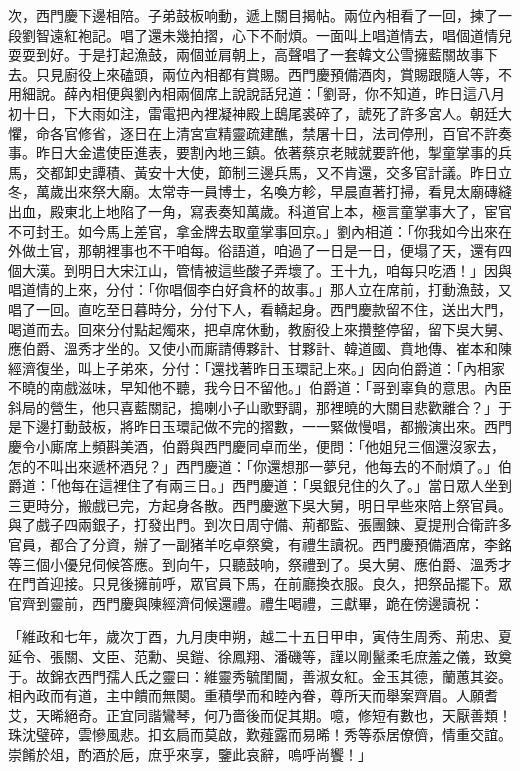 次，西門慶下邊相陪。子弟鼓板响動，遞上關目揭帖。兩位內相看了一回，揀了一段劉智遠紅袍記。唱了還未幾拍摺，心下不耐煩。一面叫上唱道情去，唱個道情兒耍耍到好。于是打起漁鼓，兩個並肩朝上，高聲唱了一套韓文公雪擁藍關故事下去。只見廚役上來磕頭，兩位內相都有賞賜。西門慶預備酒肉，賞賜跟隨人等，不用細說。薛內相便與劉內相兩個席上說說話兒道：「劉哥，你不知道，昨日這八月初十日，下大雨如注，雷電把內裡凝神殿上鴟尾裘碎了，諕死了許多宮人。朝廷大懼，命各官修省，逐日在上清宮宣精靈疏建醮，禁屠十日，法司停刑，百官不許奏事。昨日大金遣使臣進表，要割內地三鎮。依著蔡京老賊就要許他，掣童掌事的兵馬，交都卸史譚積、黃安十大使，節制三邊兵馬，又不肯還，交多官計議。昨日立冬，萬歲出來祭大廟。太常寺一員博士，名喚方軫，早晨直著打掃，看見太廟磚縫出血，殿東北上地陷了一角，寫表奏知萬歲。科道官上本，極言童掌事大了，宦官不可封王。如今馬上差官，拿金牌去取童掌事回京。」劉內相道：「你我如今出來在外做土官，那朝裡事也不干咱每。俗語道，咱過了一日是一日，便塌了天，還有四個大漢。到明日大宋江山，管情被這些酸子弄壞了。王十九，咱每只吃酒！」因與唱道情的上來，分付：「你唱個李白好貪杯的故事。」那人立在席前，打動漁鼓，又唱了一回。直吃至日暮時分，分付下人，看轎起身。西門慶款留不住，送出大門，喝道而去。回來分付點起燭來，把卓席休動，教廚役上來攢整停留，留下吳大舅、應伯爵、溫秀才坐的。又使小而廝請傅夥計、甘夥計、韓道國、賁地傳、崔本和陳經濟復坐，叫上子弟來，分付：「還找著昨日玉環記上來。」因向伯爵道：「內相家不曉的南戲滋味，早知他不聽，我今日不留他。」伯爵道：「哥到辜負的意思。內臣斜局的營生，他只喜藍關記，搗喇小子山歌野調，那裡曉的大關目悲歡離合？」于是下邊打動鼓板，將昨日玉環記做不完的摺數，一一緊做慢唱，都搬演出來。西門慶令小廝席上頻斟美酒，伯爵與西門慶同卓而坐，便問：「他姐兒三個還沒家去，怎的不叫出來遞杯酒兒？」西門慶道：「你還想那一夢兒，他每去的不耐煩了。」伯爵道：「他每在這裡住了有兩三日。」西門慶道：「吳銀兒住的久了。」當日眾人坐到三更時分，搬戲已完，方起身各散。西門慶邀下吳大舅，明日早些來陪上祭官員。與了戲子四兩銀子，打發出門。到次日周守備、荊都監、張團鍊、夏提刑合衛許多官員，都合了分資，辦了一副猪羊吃卓祭奠，有禮生讀祝。西門慶預備酒席，李銘等三個小優兒伺候答應。到向午，只聽鼓响，祭禮到了。吳大舅、應伯爵、溫秀才在門首迎接。只見後擁前呼，眾官員下馬，在前廳換衣服。良久，把祭品擺下。眾官齊到靈前，西門慶與陳經濟伺候還禮。禮生喝禮，三獻畢，跪在傍邊讀祝：

「維政和七年，歲次丁酉，九月庚申朔，越二十五日甲申，寅侍生周秀、荊忠、夏延令、張關、文臣、范勳、吳鎧、徐鳳翔、潘磯等，謹以剛鬣柔毛庶羞之儀，致奠于。故錦衣西門孺人氏之靈曰：維靈秀毓閨閫，善淑女紅。金玉其德，蘭蕙其姿。相內政而有道，主中饋而無闋。重積學而和睦內眷，尊所天而舉案齊眉。人願耆艾，天晞絕奇。正宜同諧鸞琴，何乃嗇後而促其期。噫，修短有數也，天厭善類！珠沈璧碎，雲慘風悲。扣玄扃而莫啟，歎薤露而易晞！秀等忝居僚儕，情重交誼。崇餚於俎，酌酒於巵，庶乎來享，鑒此哀辭，嗚呼尚饗！」

